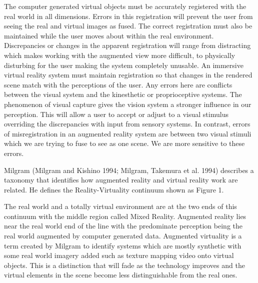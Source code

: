 The computer generated virtual objects must be accurately registered with the real world in all dimensions. Errors in this registration will prevent the user from seeing the real and virtual images as fused. The correct registration must also be maintained while the user moves about within the real environment. Discrepancies or changes in the apparent registration will range from distracting which makes working with the augmented view more difficult, to physically disturbing for the user making the system completely unusable. An immersive virtual reality system must maintain registration so that changes in the rendered scene match with the perceptions of the user. Any errors here are conflicts between the visual system and the kinesthetic or proprioceptive systems. The phenomenon of visual capture gives the vision system a stronger influence in our perception. This will allow a user to accept or adjust to a visual stimulus overriding the discrepancies with input from sensory systems. In contrast, errors of misregistration in an augmented reality system are between two visual stimuli which we are trying to fuse to see as one scene. We are more sensitive to these errors.

Milgram (Milgram and Kishino 1994; Milgram, Takemura et al. 1994) describes a taxonomy that identifies how augmented reality and virtual reality work are related. He defines the Reality-Virtuality continuum shown as Figure 1.


The real world and a totally virtual environment are at the two ends of this continuum with the middle region called Mixed Reality. Augmented reality lies near the real world end of the line with the predominate perception being the real world augmented by computer generated data. Augmented virtuality is a term created by Milgram to identify systems which are mostly synthetic with some real world imagery added such as texture mapping video onto virtual objects. This is a distinction that will fade as the technology improves and the virtual elements in the scene become less distinguishable from the real ones.

